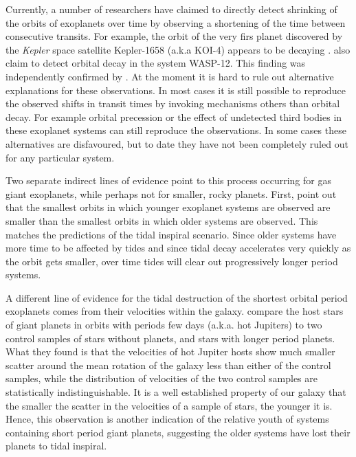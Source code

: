 Currently, a number of researchers have claimed to directly detect shrinking of
the orbits of exoplanets over time by observing a shortening of the time between
consecutive transits. For example, the orbit of the very firs planet discovered
by the \textit{Kepler} space satellite Kepler-1658 (a.k.a KOI-4) appears to be
decaying \citep{Vissapragada_et_al_22}. \citet{Maciejewski_et_al_16} also claim
to detect orbital decay in the system WASP-12. This finding was independently
confirmed by \citet{Patra_et_al_17}. At the moment it is hard to rule out
alternative explanations for these observations. In most cases it is still
possible to reproduce the observed shifts in transit times by invoking mechanisms
others than orbital decay. For example orbital precession or the effect of
undetected third bodies in these exoplanet systems can still reproduce the
observations. In some cases these alternatives are disfavoured, but to date
they have not been completely ruled out for any particular system.

Two separate indirect lines of evidence point to this process occurring for gas
giant exoplanets, while perhaps not for smaller, rocky planets. First,
\citet{Jackson_et_al_09} point out that the smallest orbits in which younger
exoplanet systems are observed are smaller than the smallest orbits in which
older systems are observed. This matches the predictions of the tidal inspiral
scenario. Since older systems have more time to be affected by tides and since
tidal decay accelerates very quickly as the orbit gets smaller, over time tides
will clear out progressively longer period systems.

A different line of evidence for the tidal destruction of the shortest orbital
period exoplanets comes from their velocities within the galaxy.
\citet{Hamer_Schlaufman_19} compare the host stars of giant planets in orbits
with periods few days (a.k.a.  hot Jupiters) to two control samples of stars
without planets, and stars with longer period planets. What they found is that
the velocities of hot Jupiter hosts show much smaller scatter around the mean
rotation of the galaxy less than either of the control samples, while the
distribution of velocities of the two control samples are statistically
indistinguishable. It is a well established property of our galaxy that the
smaller the scatter in the velocities of a sample of stars, the younger it is.
Hence, this observation is another indication of the relative youth of systems
containing short period giant planets, suggesting the older systems have lost
their planets to tidal inspiral.

